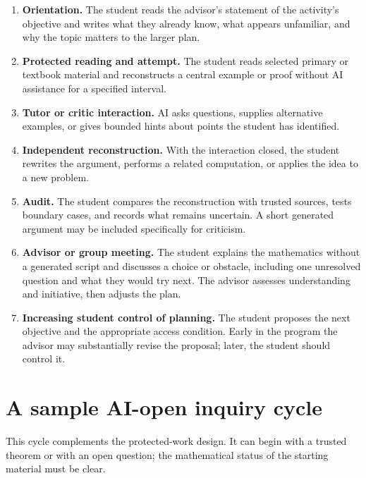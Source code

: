 \documentclass[11pt]{article}
\begin{document}
\begin{enumerate}
    \item \textbf{Orientation.} The student reads the advisor's statement of the activity's
    objective and writes what they already know, what appears unfamiliar, and why the
    topic matters to the larger plan.
    \item \textbf{Protected reading and attempt.} The student reads selected primary or
    textbook material and reconstructs a central example or proof without AI 
    assistance for a specified interval.
    \item \textbf{Tutor or critic interaction.} AI asks questions, supplies alternative
    examples, or gives bounded hints about points the student has identified.
    \item \textbf{Independent reconstruction.} With the interaction closed, the student
    rewrites the argument, performs a related computation, or applies the idea to a new problem.
    \item \textbf{Audit.} The student compares the reconstruction with trusted sources,
    tests boundary cases, and records what remains uncertain.  A short generated argument
    may be included specifically for criticism.
    \item \textbf{Advisor or group meeting.} The student explains the mathematics
    without a generated script and discusses a choice or obstacle, including one
    unresolved question and what they would try next. The advisor assesses understanding
    and initiative, then adjusts the plan.
    \item \textbf{Increasing student control of planning.} The student proposes the next objective and the
    appropriate access condition.  Early in the program the advisor may substantially
    revise the proposal; later, the student should control it.
\end{enumerate}

\section{A sample AI-open inquiry cycle}
\label{app:ai-open}

This cycle complements the protected-work design. It can begin with a trusted theorem
or with an open question; the mathematical status of the starting material must be clear.
\end{document}

